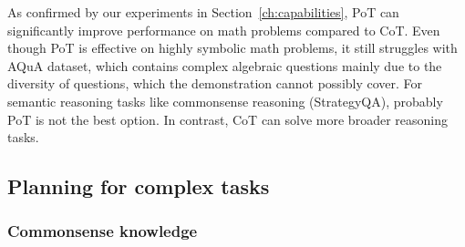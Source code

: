As confirmed by our experiments in Section~\ref{ch:capabilities}, PoT can significantly improve performance on math problems compared to CoT\@.
Even though PoT is effective on highly symbolic math problems, it still struggles with AQuA dataset, which contains complex algebraic questions mainly due to the diversity of questions, which the demonstration cannot possibly cover.
For semantic reasoning tasks like commonsense reasoning (StrategyQA), probably PoT is not the best option.
In contrast, CoT can solve more broader reasoning tasks.

\subsection{Planning for complex tasks}
\label{subsec:planning}

\subsubsection{Commonsense knowledge}

